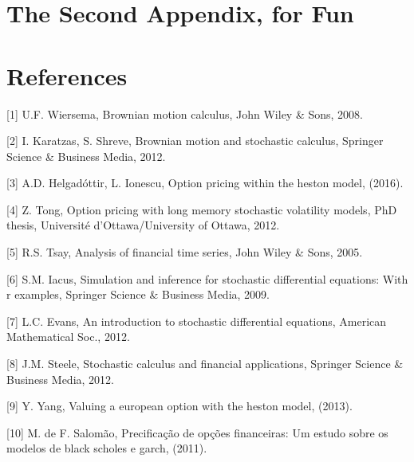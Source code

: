 \documentclass[12pt,twoside]{reedthesis}
\theoremstyle{definition}
\theoremstyle{definition}
\theoremstyle{remark}
\begin{document}
  \chapter{The Second Appendix, for
  Fun}\label{the-second-appendix-for-fun}
  
  \backmatter
  
  \chapter*{References}\label{references}
  
  \noindent
  
  \setlength{\parindent}{-0.20in} \setlength{\leftskip}{0.20in}
  \setlength{\parskip}{8pt}
  
  \hypertarget{refs}{}
  \hypertarget{ref-ubbo}{}
  {[}1{]} U.F. Wiersema, Brownian motion calculus, John Wiley \& Sons,
  2008.
  
  \hypertarget{ref-karatzas2012brownian}{}
  {[}2{]} I. Karatzas, S. Shreve, Brownian motion and stochastic calculus,
  Springer Science \& Business Media, 2012.
  
  \hypertarget{ref-helgadottir2016option}{}
  {[}3{]} A.D. Helgadóttir, L. Ionescu, Option pricing within the heston
  model, (2016).
  
  \hypertarget{ref-tong2012option}{}
  {[}4{]} Z. Tong, Option pricing with long memory stochastic volatility
  models, PhD thesis, Université d'Ottawa/University of Ottawa, 2012.
  
  \hypertarget{ref-tsay2005analysis}{}
  {[}5{]} R.S. Tsay, Analysis of financial time series, John Wiley \&
  Sons, 2005.
  
  \hypertarget{ref-iacus2009simulation}{}
  {[}6{]} S.M. Iacus, Simulation and inference for stochastic differential
  equations: With r examples, Springer Science \& Business Media, 2009.
  
  \hypertarget{ref-evans2012introduction}{}
  {[}7{]} L.C. Evans, An introduction to stochastic differential
  equations, American Mathematical Soc., 2012.
  
  \hypertarget{ref-steele2012stochastic}{}
  {[}8{]} J.M. Steele, Stochastic calculus and financial applications,
  Springer Science \& Business Media, 2012.
  
  \hypertarget{ref-yang2013valuing}{}
  {[}9{]} Y. Yang, Valuing a european option with the heston model,
  (2013).
  
  \hypertarget{ref-salomao2011precificaccao}{}
  {[}10{]} M. de F. Salomão, Precificação de opções financeiras: Um estudo
  sobre os modelos de black scholes e garch, (2011).
  
\end{document}
